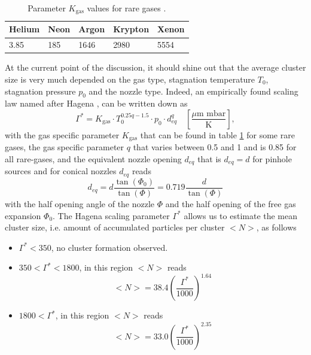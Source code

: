 \begin{table}
	\centering
		\begin{tabular}{ | l | l | l | l | l | }
			\hline
			Helium & Neon & Argon & Krypton & Xenon \\ \hline
			3.85 & 185 & 1646 & 2980 & 5554 \\ \hline
		\end{tabular}
	\caption[Parameter $K_{\text{gas}}$ values for rare gases.]{Parameter $K_{\text{gas}}$ values for rare gases \cite{Schorb-2012-Thesis}.}
	\label{tab:k-parameter}
\end{table}
At the current point of the discussion, it should shine out that the average cluster size is very much depended on the gas type, stagnation temperature $T_{0}$, stagnation pressure $p_{0}$ and the nozzle type. Indeed, an empirically found scaling law named after Hagena \cite{Hagena-1972-JCP,Hagena-1981-SurfSci,Hagena-1987-ZeitschriftAMC}, can be written down as
\begin{equation}
\Gamma^{*} = K_{\text{gas}} \cdot T_{0}^{0.25q-1.5} \cdot p_{0} \cdot d_{eq}^{q}\quad \left[\frac{\text{$\mu$m mbar}}{\text{K}}\right],
\label{eq:Hagena-parameter}
\end{equation}
with the gas specific parameter $K_{\text{gas}}$ that can be found in table \ref{tab:k-parameter} for some rare gases, the gas specific parameter $q$ that varies between 0.5 and 1 and is 0.85 for all rare-gases, and the equivalent nozzle opening $d_{eq}$ that is $d_{eq}=d$ for pinhole sources and for conical nozzles $d_{eq}$ reads \citep{Schorb-2012-Thesis}
\begin{equation}
d_{eq} = d\frac{\tan\left(\Phi_{0}\right)}{\tan\left(\Phi\right)} = 0.719 \frac{d}{\tan\left(\Phi\right)}
\label{eq:equivalent-nozzle-opening}
\end{equation}
with the half opening angle of the nozzle $\Phi$ and the half opening of the free gas expansion $\Phi_{0}$. The Hagena scaling parameter $\Gamma^{*}$ allows us to estimate the mean cluster size, i.e. amount of accumulated particles per cluster $<N>$, as follows
\begin{itemize}
	\item $\Gamma^{*} < 350$, no cluster formation observed.
	\item $350 < \Gamma^{*} < 1800$, in this region $<N>$ reads
		\begin{equation}
		<N> = 38.4 \left(\frac{\Gamma^{*}}{1000}\right)^{1.64}
		\label{eq:intermediate-hagena-scaling}
		\end{equation}
	\item $1800 < \Gamma^{*}$, in this region $<N>$ reads
		\begin{equation}
		<N> = 33.0 \left(\frac{\Gamma^{*}}{1000}\right)^{2.35}
		\label{eq:large-hagena-scaling}
		\end{equation}
\end{itemize}
